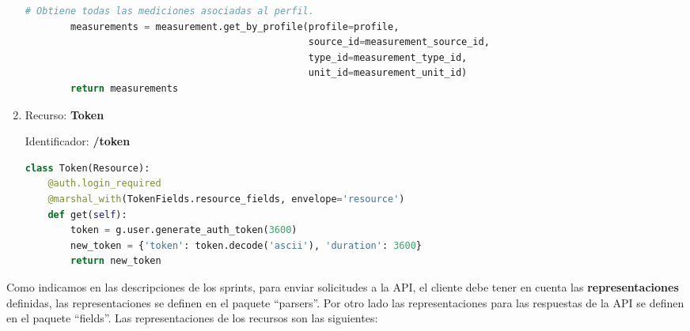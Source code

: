 \begin{enumerate}
\begin{lstlisting}[language=Python]
        # Obtiene todas las mediciones asociadas al perfil.
        measurements = measurement.get_by_profile(profile=profile,
                                                  source_id=measurement_source_id,
                                                  type_id=measurement_type_id,
                                                  unit_id=measurement_unit_id)
        return measurements
\end{lstlisting}

\item Recurso: \textbf{Token}

Identificador: \textbf{/token}

\begin{lstlisting}[language=Python]
class Token(Resource):
    @auth.login_required
    @marshal_with(TokenFields.resource_fields, envelope='resource')
    def get(self):
        token = g.user.generate_auth_token(3600)
        new_token = {'token': token.decode('ascii'), 'duration': 3600}
        return new_token
\end{lstlisting}

\end{enumerate}

Como indicamos en las descripciones de los sprints, para enviar solicitudes a la API, el cliente debe tener en cuenta las \textbf{representaciones} definidas, las representaciones se definen en el paquete ``parsers''. Por otro lado las representaciones para las respuestas de la API se definen en el paquete ``fields''. Las representaciones de los recursos son las siguientes:

